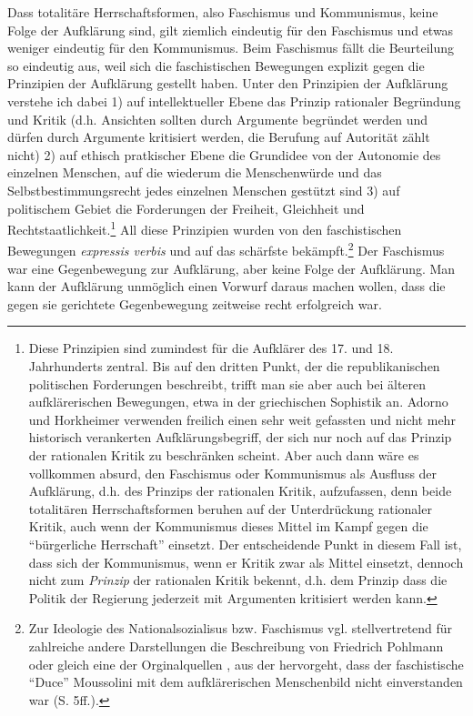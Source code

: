 \documentclass[12pt,a4paper,ngerman]{article}
\begin{document}
Dass totalitäre Herrschaftsformen, also Faschismus und Kommunismus,
keine Folge der Aufklärung sind, gilt ziemlich eindeutig für den
Faschismus und etwas weniger eindeutig für den Kommunismus. Beim
Faschismus fällt die Beurteilung so eindeutig aus, weil sich die
faschistischen Bewegungen explizit gegen die Prinzipien der Aufklärung
gestellt haben. Unter den Prinzipien der Aufklärung verstehe ich dabei
1) auf intellektueller Ebene das Prinzip rationaler Begründung und
Kritik (d.h. Ansichten sollten durch Argumente begründet werden und
dürfen durch Argumente kritisiert werden, die Berufung auf Autorität
zählt nicht) 2) auf ethisch pratkischer Ebene die Grundidee von der
Autonomie des einzelnen Menschen, auf die wiederum die Menschenwürde
und das Selbstbestimmungsrecht jedes einzelnen Menschen gestützt sind
3) auf politischem Gebiet die Forderungen der Freiheit, Gleichheit und
Rechtstaatlichkeit.\footnote{Diese Prinzipien sind zumindest für die
  Aufklärer des 17. und 18. Jahrhunderts zentral. Bis auf den dritten
  Punkt, der die republikanischen politischen Forderungen beschreibt,
  trifft man sie aber auch bei älteren aufklärerischen Bewegungen,
  etwa in der griechischen Sophistik an. Adorno und Horkheimer
  verwenden freilich einen sehr weit gefassten und nicht mehr
  historisch verankerten Aufklärungsbegriff, der sich nur noch auf das
  Prinzip der rationalen Kritik zu beschränken scheint. Aber auch dann
  wäre es vollkommen absurd, den Faschismus oder Kommunismus als
  Ausfluss der Aufklärung, d.h. des Prinzips der rationalen Kritik,
  aufzufassen, denn beide totalitären Herrschaftsformen beruhen auf
  der Unterdrückung rationaler Kritik, auch wenn der Kommunismus
  dieses Mittel im Kampf gegen die "`bürgerliche Herrschaft"'
  einsetzt. Der entscheidende Punkt in diesem Fall ist, dass sich der
  Kommunismus, wenn er Kritik zwar als Mittel einsetzt, dennoch nicht
  zum {\em Prinzip} der rationalen Kritik bekennt, d.h. dem Prinzip
  dass die Politik der Regierung jederzeit mit Argumenten kritisiert
  werden kann.} All diese Prinzipien wurden von den faschistischen
Bewegungen {\em expressis verbis} und auf das schärfste
bekämpft.\footnote{Zur Ideologie des Nationalsozialisus bzw.
  Faschismus vgl. stellvertretend für zahlreiche andere Darstellungen
  die Beschreibung von Friedrich Pohlmann \cite[S.
  229ff.]{pohlmann:1992} oder gleich eine der Orginalquellen
  \cite[]{moussolini}, aus der hervorgeht, dass der faschistische
  "`Duce"' Moussolini mit dem aufklärerischen Menschenbild nicht
  einverstanden war (S. 5ff.).}  Der Faschismus war eine Gegenbewegung
zur Aufklärung, aber keine Folge der Aufklärung. Man kann der
Aufklärung unmöglich einen Vorwurf daraus machen wollen, dass die
gegen sie gerichtete Gegenbewegung zeitweise recht erfolgreich war.
\end{document}
